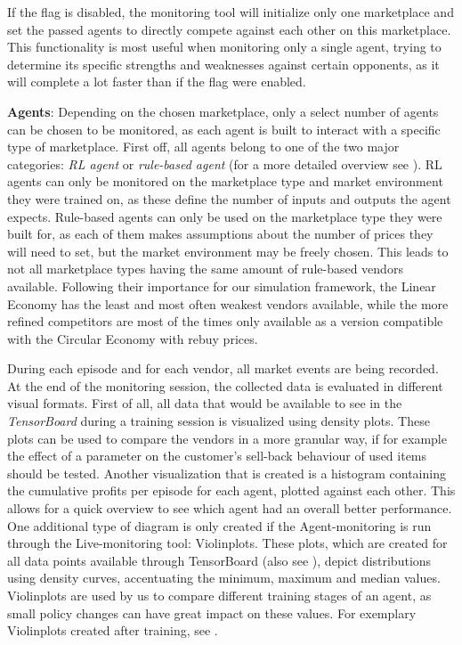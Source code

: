 If the flag is disabled, the monitoring tool will initialize only one marketplace and set the passed agents to directly compete against each other on this marketplace. This functionality is most useful when monitoring only a single agent, trying to determine its specific strengths and weaknesses against certain opponents, as it will complete a lot faster than if the flag were enabled.

\medskip
\noindent\textbf{Agents}: Depending on the chosen marketplace, only a select number of agents can be chosen to be monitored, as each agent is built to interact with a specific type of marketplace. First off, all agents belong to one of the two major categories: \emph{RL agent} or \emph{rule-based agent} (for a more detailed overview see ). RL agents can only be monitored on the marketplace type and market environment they were trained on, as these define the number of inputs and outputs the agent expects. Rule-based agents can only be used on the marketplace type they were built for, as each of them makes assumptions about the number of prices they will need to set, but the market environment may be freely chosen. This leads to not all marketplace types having the same amount of rule-based vendors available. Following their importance for our simulation framework, the Linear Economy has the least and most often weakest vendors available, while the more refined competitors are most of the times only available as a version compatible with the Circular Economy with rebuy prices.

\medskip
During each episode and for each vendor, all market events are being recorded. At the end of the monitoring session, the collected data is evaluated in different visual formats. First of all, all data that would be available to see in the \emph{TensorBoard} during a training session is visualized using density plots. These plots can be used to compare the vendors in a more granular way, if for example the effect of a parameter on the customer's sell-back behaviour of used items should be tested. Another visualization that is created is a histogram containing the cumulative profits per episode for each agent, plotted against each other. This allows for a quick overview to see which agent had an overall better performance. One additional type of diagram is only created if the Agent-monitoring is run through the Live-monitoring tool: Violinplots. These plots, which are created for all data points available through TensorBoard (also see ), depict distributions using density curves, accentuating the minimum, maximum and median values. Violinplots are used by us to compare different training stages of an agent, as small policy changes can have great impact on these values. For exemplary Violinplots created after training, see .

